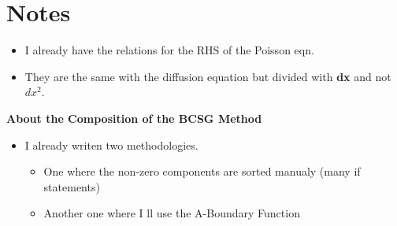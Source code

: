 \documentclass{article}
\begin{document}
\section {Notes}

\begin{itemize}
\item I already have the relations for the RHS of the Poisson eqn.
\item They are the same with the diffusion equation but divided with \textbf{dx} and
      not \textbf{$dx^2$}.
\end{itemize}

\textbf{About the Composition of the BCSG Method}
\begin{itemize}
\item  I already writen two methodologies. 
  \begin{itemize}
  \item One where the non-zero components are sorted manualy (many if statements)
  \item Another one where I ll use the A-Boundary Function 
  \end{itemize}
\end{itemize}
\end{document}
